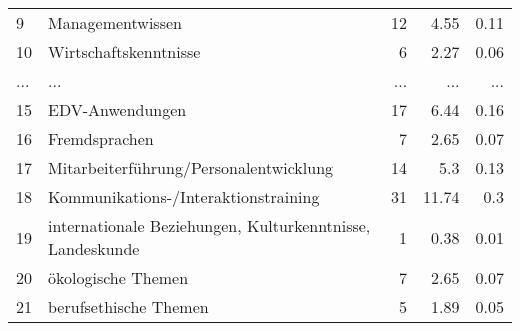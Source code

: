 \begin{longtable}{lXrrr}
        9 & \multicolumn{1}{X}{Managementwissen} & %
          \num{12} &
          \num[round-mode=places,round-precision=2]{4.55} &
          \num[round-mode=places,round-precision=2]{0.11} \\
        10 & \multicolumn{1}{X}{Wirtschaftskenntnisse} & %
          \num{6} &
          \num[round-mode=places,round-precision=2]{2.27} &
          \num[round-mode=places,round-precision=2]{0.06} \\
       ... & ... & ... & ... & ... \\
        15 & \multicolumn{1}{X}{EDV-Anwendungen} & %
          \num{17} &
          \num[round-mode=places,round-precision=2]{6.44} &
          \num[round-mode=places,round-precision=2]{0.16} \\

        16 & \multicolumn{1}{X}{Fremdsprachen} & %
          \num{7} &
          \num[round-mode=places,round-precision=2]{2.65} &
          \num[round-mode=places,round-precision=2]{0.07} \\

        17 & \multicolumn{1}{X}{Mitarbeiterführung/Personalentwicklung} & %
          \num{14} &
          \num[round-mode=places,round-precision=2]{5.3} &
          \num[round-mode=places,round-precision=2]{0.13} \\

        18 & \multicolumn{1}{X}{Kommunikations-/Interaktionstraining} & %
          \num{31} &
          \num[round-mode=places,round-precision=2]{11.74} &
          \num[round-mode=places,round-precision=2]{0.3} \\

        19 & \multicolumn{1}{X}{internationale Beziehungen, Kulturkenntnisse, Landeskunde} & %
          \num{1} &
          \num[round-mode=places,round-precision=2]{0.38} &
          \num[round-mode=places,round-precision=2]{0.01} \\

        20 & \multicolumn{1}{X}{ökologische Themen} & %
          \num{7} &
          \num[round-mode=places,round-precision=2]{2.65} &
          \num[round-mode=places,round-precision=2]{0.07} \\

        21 & \multicolumn{1}{X}{berufsethische Themen} & %
          \num{5} &
          \num[round-mode=places,round-precision=2]{1.89} &
          \num[round-mode=places,round-precision=2]{0.05} \\


\end{longtable}
